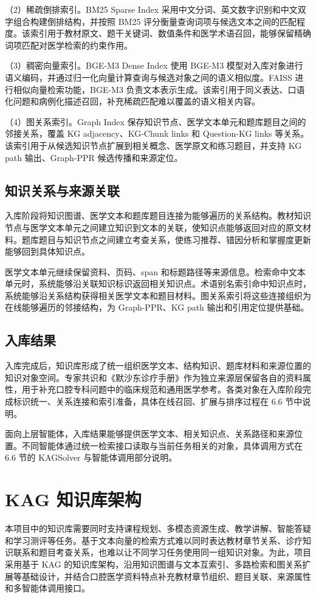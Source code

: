 （2）稀疏倒排索引。BM25 Sparse Index 采用中文分词、英文数字识别和中文双字组合构建倒排结构，并按照 BM25 评分衡量查询词项与候选文本之间的匹配程度。该索引用于教材原文、题干关键词、数值条件和医学术语召回，能够保留精确词项匹配对医学检索的约束作用。

（3）稠密向量索引。BGE-M3 Dense Index 使用 BGE-M3 模型\cite{chen2024m3embedding}对入库对象进行语义编码，并通过归一化向量计算查询与候选对象之间的语义相似度。FAISS 进行相似向量检索功能，BGE-M3 负责文本表示生成。该索引用于同义表达、口语化问题和病例化描述召回，补充稀疏匹配难以覆盖的语义相关内容。

（4）图关系索引。Graph Index 保存知识节点、医学文本单元和题库题目之间的邻接关系，覆盖 KG adjacency、KG-Chunk links 和 Question-KG links 等关系。该索引用于从候选知识节点扩展到相关概念、医学原文和练习题目，并支持 KG path 输出、Graph-PPR 候选传播和来源定位。

\subsection{知识关系与来源关联}

入库阶段将知识图谱、医学文本和题库题目连接为能够遍历的关系结构。教材知识节点与医学文本单元之间建立知识到文本的关联，使知识点能够返回对应的原文材料。题库题目与知识节点之间建立考查关系，使练习推荐、错因分析和掌握度更新能够回到具体知识点。

医学文本单元继续保留资料、页码、span 和标题路径等来源信息。检索命中文本单元时，系统能够沿关联知识标识返回相关知识点。术语别名索引命中知识点时，系统能够沿关系结构获得相关医学文本和题目材料。图关系索引将这些连接组织为在线能够遍历的邻接结构，为 Graph-PPR、KG path 输出和引用定位提供基础。

\subsection{入库结果}

入库完成后，知识库形成了统一组织医学文本、结构知识、题库材料和来源位置的知识对象空间。专家共识和《默沙东诊疗手册》作为独立来源层保留各自的资料属性，用于补充口腔专科问题中的临床规范和通用医学参考。各类对象在入库阶段完成标识统一、关系连接和索引准备，具体在线召回、扩展与排序过程在 6.6 节中说明。

面向上层智能体，入库结果能够提供医学文本、相关知识点、关系路径和来源位置。不同智能体通过统一检索接口读取与当前任务相关的对象，具体调用方式在 6.6 节的 KAGSolver 与智能体调用部分说明。

\section{KAG 知识库架构}
本项目中的知识库需要同时支持课程规划、多模态资源生成、教学讲解、智能答疑和学习测评等任务。基于文本向量的检索方式难以同时表达教材章节关系、诊疗知识联系和题目考查关系，也难以让不同学习任务使用同一组知识对象。为此，项目采用基于 KAG 的知识库架构，沿用知识图谱与文本互索引、多路检索和图关系扩展等基础设计，并结合口腔医学资料特点补充教材章节组织、题目关联、来源属性和多智能体调用接口。

